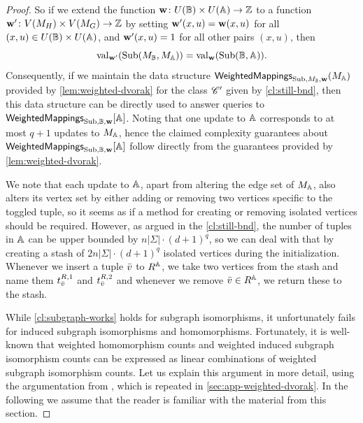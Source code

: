 \begin{proof}
	So if we extend the function $\mathbf{w} \colon U(\mathbb{B}) \times U(\mathbb{A}) \to \mathbb{Z}$ to a function $\mathbf{w}' \colon V(M_H) \times V(M_G) 
	\to \mathbb{Z}$ by setting $\mathbf{w}'(x, u) = \mathbf{w}(x, u)$ for all $(x, u) \in U(\mathbb{B}) \times U(\mathbb{A})$, and $\mathbf{w}'(x, u)=1$ for all other pairs $(x,u)$, then
	\[\mathrm{val}_{\mathbf{w}'}(\mathrm{Sub}(M_{\mathbb{B}},M_{\mathbb{A}}))=\mathrm{val}_{\mathbf{w}}(\mathrm{Sub}(\mathbb{B},\mathbb{A})).\]
	Consequently, if we maintain the data structure $\mathsf{WeightedMappings}_{\mathrm{Sub}, M_{\mathbb{B}}, \mathbf{w}}(M_{\mathbb{A}})$ provided by \cref{lem:weighted-dvorak} for the class $\mathscr C'$ given by \cref{cl:still-bnd}, then this data structure can be directly used to answer queries to $\mathsf{WeightedMappings}_{\mathrm{Sub},\mathbb{B},\mathbf{w}}[\mathbb{A}]$. Noting that one update to $\mathbb{A}$ corresponds to at most $q+1$ updates to $M_{\mathbb{A}}$, hence the claimed complexity guarantees about $\mathsf{WeightedMappings}_{\mathrm{Sub},\mathbb{B},\mathbf{w}}[\mathbb{A}]$ follow directly from the guarantees provided by \cref{lem:weighted-dvorak}. 
	
	We note that each update to $\mathbb{A}$, apart from altering the edge set of $M_{\mathbb{A}}$, also alters its vertex set by either adding or removing two vertices specific to the toggled tuple, so it seems as if a method for creating or removing isolated vertices should be required. However, as argued in the \cref{cl:still-bnd}, the number of tuples in $\mathbb{A}$ can be upper bounded by $n|\Sigma|\cdot (d+1)^q$, so we can deal with that by creating a stash of $2n|\Sigma|\cdot (d+1)^q$ isolated vertices during the initialization. Whenever we insert a tuple ${\bar{v}}$ to $R^{\mathbb{A}}$, we take two vertices from the stash and name them $t^{R,1}_{\bar{v}}$ and $t^{R,2}_{\bar{v}}$ and whenever we remove ${\bar{v}} \in R^{\mathbb{A}}$, we return these to the stash.
	
	
	
	While \cref{cl:subgraph-works} holds for subgraph isomorphisms, it unfortunately fails for induced subgraph isomorphisms and homomorphisms. Fortunately, it is well-known that weighted homomorphism counts and weighted induced subgraph isomorphism counts can be expressed as linear combinations of weighted subgraph isomorphism counts. Let us explain this argument in more detail, using the argumentation from \cite{DvorakTumaArxiv}, which is repeated in \cref{sec:app-weighted-dvorak}. In the following we assume that the reader is familiar with the material from this section.
	

\end{proof}
